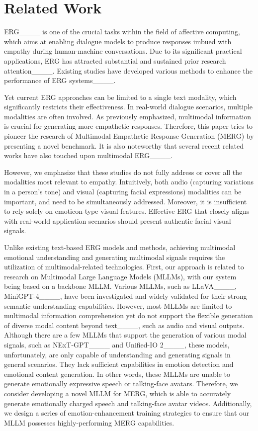 \section{Related Work}
ERG____ is one of the crucial tasks within the field of affective computing, which aims at enabling dialogue models to produce responses imbued with empathy during human-machine conversations. 
Due to its significant practical applications, ERG has attracted substantial and sustained prior research attention____. 
Existing studies have developed various methods to enhance the performance of ERG systems____. 

Yet current ERG approaches can be limited to a single text modality, which significantly restricts their effectiveness. 
In real-world dialogue scenarios, multiple modalities are often involved. 
As previously emphasized, multimodal information is crucial for generating more empathetic responses. 
Therefore, this paper tries to pioneer the research of Multimodal Empathetic Response Generation (MERG) by presenting a novel benchmark. 
It is also noteworthy that several recent related works have also touched upon multimodal ERG____. 

However, we emphasize that these studies do not fully address or cover all the modalities most relevant to empathy. 
Intuitively, both audio (capturing variations in a person’s tone) and visual (capturing facial expressions) modalities can be important, and need to be simultaneously addressed. 
Moreover, it is insufficient to rely solely on emoticon-type visual features. 
Effective ERG that closely aligns with real-world application scenarios should present authentic facial visual signals.







Unlike existing text-based ERG models and methods, achieving multimodal emotional understanding and generating multimodal signals requires the utilization of multimodal-related technologies. 
First, our approach is related to research on Multimodal Large Language Models (MLLMs), with our system being based on a backbone MLLM. 
Various MLLMs, such as LLaVA____, MiniGPT-4____, have been investigated and widely validated for their strong semantic understanding capabilities. 
However, most MLLMs are limited to multimodal information comprehension yet do not support the flexible generation of diverse modal content beyond text____, such as audio and visual outputs.
Although there are a few MLLMs that support the generation of various modal signals, such as NExT-GPT____ and Unified-IO 2____, these models, unfortunately, are only capable of understanding and generating signals in general scenarios. 
They lack sufficient capabilities in emotion detection and emotional content generation. 
In other words, these MLLMs are unable to generate emotionally expressive speech or talking-face avatars.
Therefore, we consider developing a novel MLLM for MERG, which is able to accurately generate emotionally charged speech and talking-face avatar videos. 
Additionally, we design a series of emotion-enhancement training strategies to ensure that our MLLM possesses highly-performing MERG capabilities.